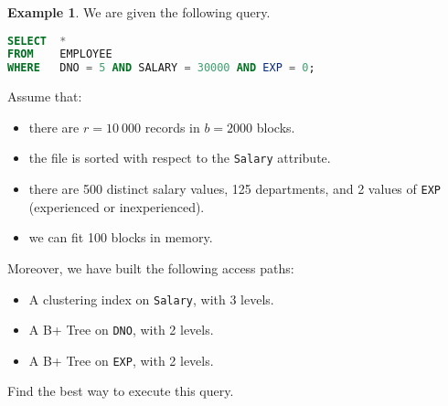\documentclass[a4paper, openany]{memoir}
\theoremstyle{definition}
\newtheorem{example}[subsection]{Example}
\begin{document}
\begin{example}
    We are given the following query.
\begin{lstlisting}[language=SQL]
SELECT  *
FROM    EMPLOYEE
WHERE   DNO = 5 AND SALARY = 30000 AND EXP = 0;
\end{lstlisting}
    Assume that:
    \begin{itemize}
        \item there are $r = 10 \ 000$ records in $b = 2000$ blocks.
        \item the file is sorted with respect to the \texttt{Salary} attribute.
        \item there are 500 distinct salary values, 125 departments, and 2 values of \texttt{EXP} (experienced or inexperienced). 
        \item we can fit 100 blocks in memory.
    \end{itemize}
    Moreover, we have built the following access paths:
    \begin{itemize}
        \item A clustering index on \texttt{Salary}, with 3 levels.
        \item A B+ Tree on \texttt{DNO}, with 2 levels.
        \item A B+ Tree on \texttt{EXP}, with 2 levels.
    \end{itemize}
    Find the best way to execute this query.
\end{example}
\end{document}

